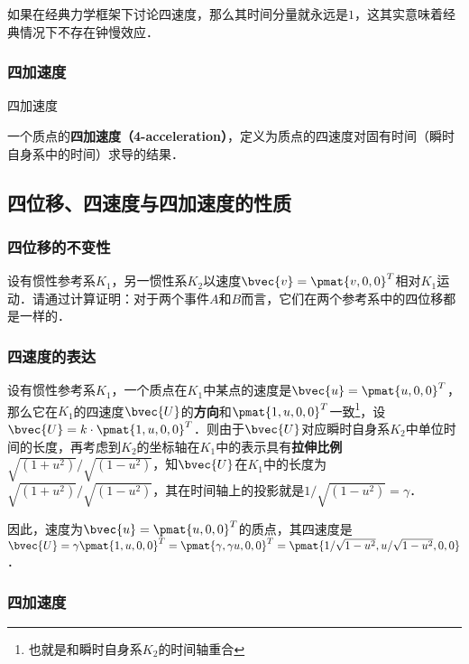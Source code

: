 如果在经典力学框架下讨论四速度，那么其时间分量就永远是$1$，这其实意味着经典情况下不存在钟慢效应．

\subsubsection{四加速度}

\begin{definition}{四加速度}

一个质点的\textbf{四加速度（4-acceleration）}，定义为质点的四速度对固有时间（瞬时自身系中的时间）求导的结果．

\end{definition}

\subsection{四位移、四速度与四加速度的性质}

\subsubsection{四位移的不变性}

\begin{exercise}{}

设有惯性参考系$K_1$，另一惯性系$K_2$以速度$\bvec{v}=\pmat{v, 0, 0}^T$相对$K_1$运动．请通过计算证明：对于两个事件$A$和$B$而言，它们在两个参考系中的四位移都是一样的．

\end{exercise}

\subsubsection{四速度的表达}

设有惯性参考系$K_1$，一个质点在$K_1$中某点的速度是$\bvec{u}=\pmat{u, 0, 0}^T$，那么它在$K_1$的四速度$\bvec{U}$的\textbf{方向}和$\pmat{1, u, 0, 0}^T$一致\footnote{也就是和瞬时自身系$K_2$的时间轴重合}，设$\bvec{U}=k\cdot\pmat{1, u, 0, 0}^T$．则由于$\bvec{U}$对应瞬时自身系$K_2$中单位时间的长度，再考虑到$K_2$的坐标轴在$K_1$中的表示具有\textbf{拉伸比例}$\sqrt{(1+u^2)}/\sqrt{(1-u^2)}$，知$\bvec{U}$在$K_1$中的长度为$\sqrt{(1+u^2)}/\sqrt{(1-u^2)}$，其在时间轴上的投影就是$1/\sqrt{(1-u^2)}=\gamma$．

因此，速度为$\bvec{u}=\pmat{u, 0, 0}^T$的质点，其四速度是$\bvec{U}=\gamma\pmat{1, u, 0, 0}^T=\pmat{\gamma, \gamma u, 0, 0}^T=\pmat{1/\sqrt{1-u^2}, u/\sqrt{1-u^2}, 0, 0}$．

\subsubsection{四加速度}



